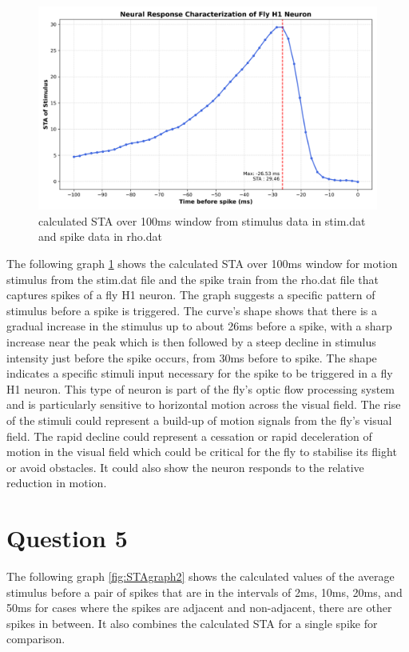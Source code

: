 \documentclass[11pt]{article}
\begin{document}
\begin{figure}
    \centering
    \includegraphics[width=1.0\linewidth]{Figure_STA.png}
    \caption{calculated STA over 100ms window from stimulus data in stim.dat and spike data in rho.dat}
    \label{fig:STAgraph1}
\end{figure}
The following graph \ref{fig:STAgraph1} shows the calculated STA over 100ms window for motion stimulus from the stim.dat file and the spike train from the rho.dat file that captures spikes of a fly H1 neuron. The graph suggests a specific pattern of stimulus before a spike is triggered. The curve's shape shows that there is a gradual increase in the stimulus up to about 26ms before a spike, with a sharp increase near the peak which is then followed by a steep decline in stimulus intensity just before the spike occurs, from 30ms before to spike. The shape indicates a specific stimuli input necessary for the spike to be triggered in a fly H1 neuron. This type of neuron is part of the fly's optic flow processing system and is particularly sensitive to horizontal motion across the visual field. The rise of the stimuli could represent a build-up of motion signals from the fly's visual field. The rapid decline could represent a cessation or rapid deceleration of motion in the visual field which could be critical for the fly to stabilise its flight or avoid obstacles. It could also show the neuron responds to the relative reduction in motion.


\section*{Question 5} \label{question 5}
The following graph \ref{fig:STAgraph2} shows the calculated values of the average stimulus before a pair of spikes that are in the intervals of 2ms, 10ms, 20ms, and 50ms for cases where the spikes are adjacent and non-adjacent, there are other spikes in between. It also combines the calculated STA for a single spike for comparison.
\end{document}
